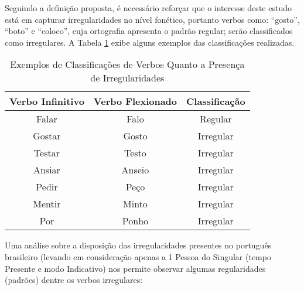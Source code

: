 


Seguindo a definição proposta, é necessário reforçar que o interesse deste estudo está em capturar irregularidades no nível fonético, portanto verbos como: “gosto”, “boto” e “coloco”, cuja ortografia apresenta o padrão regular; serão classificados como irregulares. A Tabela \ref{tab:irreg} exibe alguns exemplos das classificações realizadas.

\begin{center}
\begin{table}[H]
\centering
\begin{tabular}{ccc}
\multicolumn{1}{l}{\textbf{Verbo Infinitivo}} & \multicolumn{1}{l}{\textbf{Verbo Flexionado}} & \multicolumn{1}{l}{\textbf{Classificação}} \\ \hline
Falar & Falo & Regular \\
Gostar & Gosto & Irregular \\
Testar & Testo & Irregular \\
Ansiar & Anseio & Irregular \\
Pedir & Peço & Irregular \\
Mentir & Minto & Irregular \\
Por & Ponho & Irregular
\end{tabular}
\caption{Exemplos de Classificações de Verbos Quanto a Presença de Irregularidades}
\label{tab:irreg}
\end{table}
\end{center}

Uma análise sobre a disposição das irregularidades presentes no português brasileiro (levando em consideração apenas a 1 Pessoa do Singular (tempo Presente e modo Indicativo) nos permite observar algumas regularidades (padrões) dentre os verbos irregulares:\\

